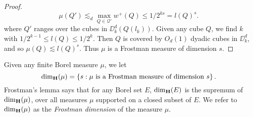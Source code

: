 \begin{proof}
	\[ \mu(Q') \lesssim_d \max_{Q \in \mathcal{Q}'} w^+(Q) \leq 1/2^{ks} = l(Q)^s. \]
	where $Q'$ ranges over the cubes in $\DD_k^d(Q(l_k))$. Given any cube $Q$, we find $k$ with $1/2^{k-1} \leq l(Q) \leq 1/2^k$. Then $Q$ is covered by $O_d(1)$ dyadic cubes in $\DD_k^d$, and so $\mu(Q) \lesssim l(Q)^s$. Thus $\mu$ is a Frostman measure of dimension $s$.
\end{proof}

Given any finite Borel measure $\mu$, we let
%
\[ \hausdim(\mu) = \left\{ s : \mu\ \text{is a Frostman measure of dimension $s$} \right\}. \]
%
Frostman's lemma says that for any Borel set $E$, $\operatorname{\dim_{\mathbf{H}}}(E)$ is the supremum of $\operatorname{\dim_{\mathbf{H}}}(\mu)$, over all measures $\mu$ supported on a closed subset of $E$. We refer to $\operatorname{\dim_{\mathbf{H}}}(\mu)$ as the \emph{Frostman dimension} of the measure $\mu$.

